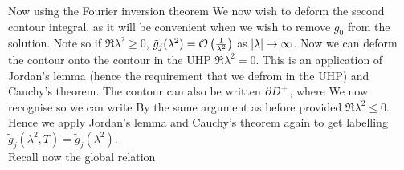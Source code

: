 \documentclass{article}
\begin{document}
Now using the Fourier inversion theorem 
We now wish to deform the second contour integral, as it will be convenient when we wish to remove $g_0$ from the solution. Note 
so if $\Re \lambda^2 \geq 0$, $\tilde{g}_j(\lambda^2) = \mathcal{O}\left( \frac{1}{\lambda^2} \right)$ as $\left\lvert \lambda \right\rvert\to\infty$. Now we can deform the contour onto the contour in the UHP $\Re \lambda^2 = 0$. This is an application of Jordan's lemma (hence the requirement that we defrom in the UHP) and Cauchy's theorem. The contour can also be written $\partial D^+$, where
We now recognise
so we can write 
By the same argument as before 
provided $\Re \lambda^2 \leq 0$. Hence we apply Jordan's lemma and Cauchy's theorem again to get 
labelling $\tilde{g}_j(\lambda^2,T) = \tilde{g}_j(\lambda^2)$. \\
Recall now the global relation 
\end{document}
